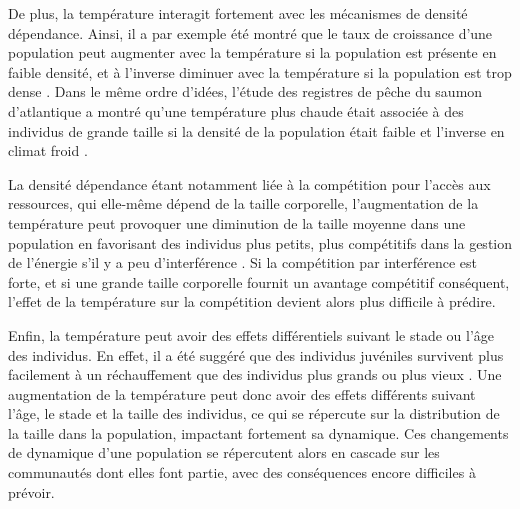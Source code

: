 De plus, la température interagit fortement avec les mécanismes de densité
dépendance. Ainsi, il a par exemple été montré que le taux de croissance d'une
population peut augmenter avec la température si la population est présente en
faible densité, et à l'inverse diminuer avec la température si la population est
trop dense \autocites[chez le saumon royal][]{crozier2010a}. Dans le même
ordre d'idées, l'étude des registres de pêche du saumon d'atlantique a montré
qu'une température plus chaude était associée à des individus de grande taille si la
densité de la population était faible et l'inverse en climat froid
\autocites{huusko2012a}. 

La densité dépendance étant notamment liée à la compétition pour l'accès aux
ressources, qui elle-même dépend de la taille corporelle, l'augmentation de la
température peut provoquer une diminution de la taille moyenne dans une
population en favorisant des individus plus petits, plus compétitifs dans la
gestion de l'énergie s'il y a peu d'interférence
\autocites{persson1998a,ohlberger2012a}. Si la compétition par interférence est
forte, et si une grande taille corporelle fournit un avantage compétitif
conséquent, l'effet de la température sur la compétition devient alors plus difficile à
prédire.

Enfin, la température peut avoir des effets différentiels suivant le stade ou
l'âge des individus. En effet, il a été suggéré que des individus juvéniles
survivent plus facilement à un réchauffement que des individus plus grands ou
plus vieux \autocites{peck2009a}. Une augmentation de la température peut donc
avoir des effets différents suivant l'âge, le stade et la taille des individus,
ce qui se répercute sur la distribution de la taille dans la population, impactant
fortement sa dynamique. Ces changements de dynamique d'une population se
répercutent alors en cascade sur les communautés dont elles font partie, avec
des conséquences encore difficiles à prévoir. 
